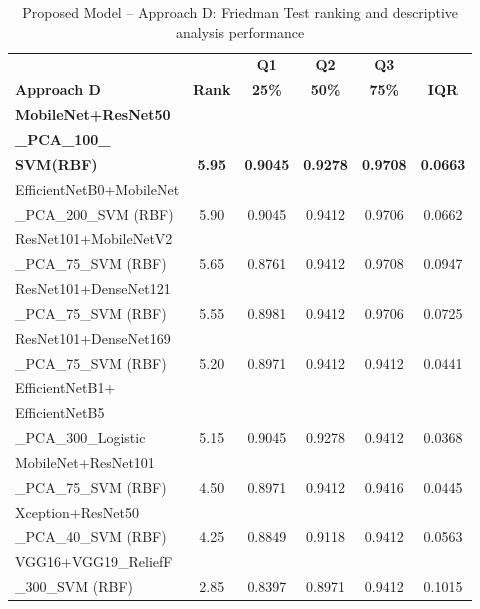 \documentclass[preprint,12pt]{elsarticle}
\begin{document}
\begin{table}[h!]
	\caption{Proposed Model – Approach D: Friedman Test ranking and descriptive analysis performance}
	\label{tab:Approach_D_ranking}
	\centering
	\begin{tabular}{|l|c|c|c|c|c|}
		\hline
		\textbf{} & \textbf{} & \textbf{Q1} & \textbf{Q2} & \textbf{Q3} & \textbf{} \\
		\textbf{Approach D} & \textbf{Rank} & \textbf{25\%} & \textbf{50\%} & \textbf{75\%} & \textbf{IQR} \\
		\hline
		\textbf{MobileNet+ResNet50} &  &  &  &  &  \\
		\textbf{\_PCA\_100\_} & & &  &  & \\
		\textbf{SVM(RBF)} & \textbf{5.95} & \textbf{0.9045} & \textbf{0.9278} & \textbf{0.9708} & \textbf{0.0663} \\
		EfficientNetB0+MobileNet &  &  &  &  &  \\
		\_PCA\_200\_SVM (RBF) & 5.90 & 0.9045 & 0.9412 & 0.9706 & 0.0662 \\
		ResNet101+MobileNetV2 & &  &  &  &  \\
		\_PCA\_75\_SVM (RBF) & 5.65 & 0.8761 & 0.9412 & 0.9708 & 0.0947 \\
		ResNet101+DenseNet121 &  &  &  &  &  \\
		\_PCA\_75\_SVM (RBF) & 5.55 & 0.8981 & 0.9412 & 0.9706 & 0.0725 \\
		ResNet101+DenseNet169 &  &  &  &  &  \\
		\_PCA\_75\_SVM (RBF) & 5.20 & 0.8971 & 0.9412 & 0.9412 & 0.0441 \\
		EfficientNetB1+ &  &  & &  &  \\
		EfficientNetB5 &  &  & &  &  \\
		\_PCA\_300\_Logistic & 5.15 & 0.9045 & 0.9278 & 0.9412 & 0.0368 \\
		MobileNet+ResNet101 &  &  & & &  \\
		\_PCA\_75\_SVM (RBF) & 4.50 & 0.8971 & 0.9412 & 0.9416 & 0.0445 \\
		Xception+ResNet50 & &  &  &  &  \\
		\_PCA\_40\_SVM (RBF) & 4.25 & 0.8849 & 0.9118 & 0.9412 & 0.0563 \\
		VGG16+VGG19\_ReliefF & &  &  &  &  \\
		\_300\_SVM (RBF) & 2.85 & 0.8397 & 0.8971 & 0.9412 & 0.1015 \\
		\hline
	\end{tabular}
\end{table}
\end{document}
